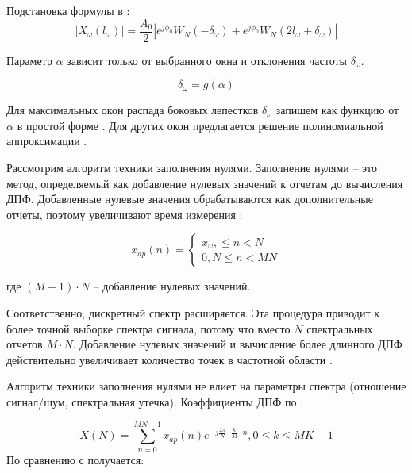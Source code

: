 Подстановка формулы  в :
\begin{equation}
	\label{eq:equation19}
	\left|{X_\omega(l_\omega)} \right| = \frac{A_0}{2} \left| e^{j\phi_0}W_N(- \delta_\omega) +e^{j\phi_0}W_N(2l_\omega+\delta_\omega) \right| 
\end{equation}

Параметр $\alpha$ зависит только от выбранного окна и отклонения частоты $\delta_{\omega}$. 

\begin{equation}
	\label{eq:equation20}
	\delta_\omega = g(\alpha)
\end{equation}

Для максимальных окон распада боковых лепестков $\delta_{\omega}$ запишем как функцию от $\alpha$ в простой форме \cite{zhang2001algorithm, qian2007interharmonics, xie1996nonlinear, luo2015phase, belega2009multifrequency, belega2010accuracy}. Для других окон предлагается решение полиномиальной аппроксимации \cite{duda2011dft}. 

Рассмотрим алгоритм техники заполнения нулями. Заполнение нулями -- это метод, определяемый как добавление нулевых значений к отчетам до вычисления ДПФ. Добавленные нулевые значения обрабатываются как дополнительные отчеты, поэтому увеличивают время измерения :

\begin{equation}
	\label{eq:equation21}
	x_{ap}(n)=
	\begin{cases}
		x_{\omega}, \leq n < N
		\\ 0, N \leq n < MN
	\end{cases}
\end{equation}

где $(M-1) \cdot N$ -- добавление нулевых значений.

Соответственно, дискретный спектр расширяется. Эта процедура приводит к более точной выборке спектра сигнала, потому что вместо $N$ спектральных отчетов $M \cdot N$. Добавление нулевых значений и вычисление более длинного ДПФ действительно увеличивает количество точек в частотной области \cite{dorf2006circuits}.

Алгоритм техники заполнения нулями не влиет на параметры спектра (отношение сигнал/шум, спектральная утечка).  Коэффициенты ДПФ по :

\begin{equation}
	\label{eq:equation22}
	X(N)= \sum_{n=0}^{MN-1} x_{ap}(n) e^{-j \frac{2 \pi}{N}\cdot \frac{k}{M} \cdot n}, 0\leq k \leq MK-1
\end{equation}
По сравнению с  получается:

